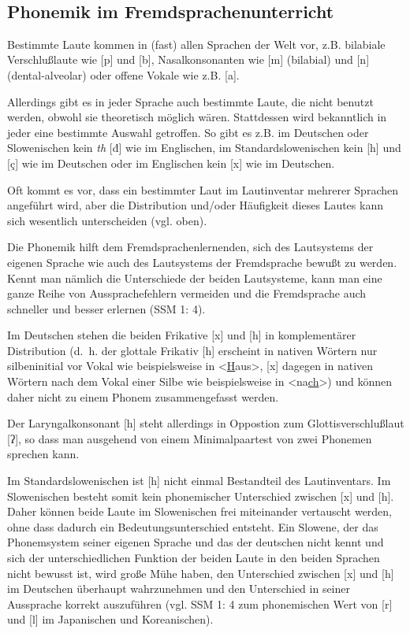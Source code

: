 \documentclass[
]{article}
\begin{document}
~

\hypertarget{phonemik-im-fremdsprachenunterricht}{%
\subsection{Phonemik im Fremdsprachenunterricht}\label{phonemik-im-fremdsprachenunterricht}}

Bestimmte Laute kommen in (fast) allen Sprachen der Welt vor, z.B.
bilabiale Verschlußlaute wie {[}p{]} und {[}b{]}, Nasalkonsonanten wie {[}m{]}
(bilabial) und {[}n{]} (dental-alveolar) oder offene Vokale wie z.B. {[}a{]}.

Allerdings gibt es in jeder Sprache auch bestimmte Laute, die nicht
benutzt werden, obwohl sie theoretisch möglich wären. Stattdessen wird
bekanntlich in jeder eine bestimmte Auswahl getroffen. So gibt es z.B.
im Deutschen oder Slowenischen kein \emph{th} {[}đ{]} wie im Englischen, im
Standardslowenischen kein {[}h{]} und {[}ç{]} wie im Deutschen oder im
Englischen kein {[}x{]} wie im Deutschen.

Oft kommt es vor, dass ein bestimmter Laut im Lautinventar mehrerer
Sprachen angeführt wird, aber die Distribution und/oder Häufigkeit
dieses Lautes kann sich wesentlich unterscheiden (vgl. oben).

Die Phonemik hilft dem Fremdsprachenlernenden, sich des Lautsystems der
eigenen Sprache wie auch des Lautsystems der Fremdsprache bewußt zu
werden. Kennt man nämlich die Unterschiede der beiden Lautsysteme, kann
man eine ganze Reihe von Aussprachefehlern vermeiden und die
Fremdsprache auch schneller und besser erlernen (SSM 1: 4).

Im Deutschen stehen die beiden Frikative {[}x{]} und {[}h{]} in komplementärer
Distribution (d.~h. der glottale Frikativ {[}h{]} erscheint in nativen
Wörtern nur silbeninitial vor Vokal wie beispielsweise in
\textless{}\underline{H}aus\textgreater, {[}x{]} dagegen in nativen Wörtern nach dem Vokal einer
Silbe wie beispielsweise in \textless na\underline{ch}\textgreater) und können daher nicht zu
einem Phonem zusammengefasst werden.

Der Laryngalkonsonant {[}h{]} steht allerdings in Oppostion zum
Glottisverschlußlaut {[}ʔ{]}, so dass man ausgehend von einem
Minimalpaartest von zwei Phonemen sprechen kann.

Im Standardslowenischen ist {[}h{]} nicht einmal Bestandteil des
Lautinventars. Im Slowenischen besteht somit kein phonemischer
Unterschied zwischen {[}x{]} und {[}h{]}. Daher können beide Laute im
Slowenischen frei miteinander vertauscht werden, ohne dass dadurch ein
Bedeutungsunterschied entsteht. Ein Slowene, der das Phonemsystem seiner
eigenen Sprache und das der deutschen nicht kennt und sich der
unterschiedlichen Funktion der beiden Laute in den beiden Sprachen nicht
bewusst ist, wird große Mühe haben, den Unterschied zwischen {[}x{]} und {[}h{]}
im Deutschen überhaupt wahrzunehmen und den Unterschied in seiner
Aussprache korrekt auszuführen (vgl. SSM 1: 4 zum phonemischen Wert von
{[}r{]} und {[}l{]} im Japanischen und Koreanischen).
\end{document}
